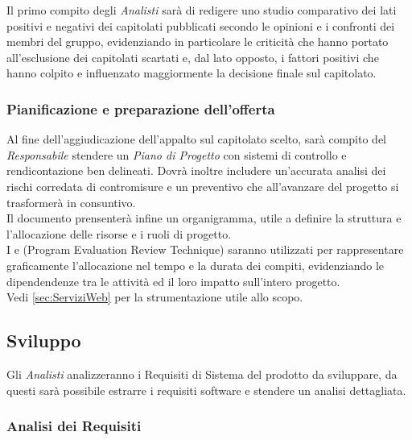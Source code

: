 \documentclass{scalatekids-article}
\begin{document}
Il primo compito degli \textit{Analisti} sarà di redigere uno studio comparativo
dei lati positivi e negativi dei capitolati pubblicati secondo le opinioni e i
confronti dei membri del gruppo, evidenziando in particolare le criticità che
hanno portato all'esclusione dei capitolati scartati e, dal lato opposto, i
fattori positivi che hanno colpito e influenzato maggiormente la decisione
finale sul capitolato.

\subsubsection{Pianificazione e preparazione dell'offerta}

Al fine dell'aggiudicazione dell'appalto sul capitolato scelto, sarà compito del
\textit{Responsabile} stendere un \textit{Piano di Progetto} con sistemi di
controllo e rendicontazione ben delineati. Dovrà inoltre includere un'accurata
analisi dei rischi corredata di contromisure e un preventivo che all'avanzare
del progetto si trasformerà in consuntivo.\\
Il documento prensenterà infine un organigramma, utile a definire la struttura
e l'allocazione delle risorse e i ruoli di progetto.\\
I  e  (Program Evaluation Review
Technique) saranno utilizzati per rappresentare graficamente l'allocazione nel
tempo e la durata dei compiti, evidenziando le dipendendenze tra le attività ed
il loro impatto sull'intero progetto.\\
Vedi \ref{sec:ServiziWeb} per la strumentazione utile allo scopo.

\subsection{Sviluppo}

Gli \textit{Analisti} analizzeranno i Requisiti di Sistema del prodotto da
sviluppare, da questi sarà possibile estrarre i requisiti software e stendere un
analisi dettagliata.

\subsubsection{Analisi dei Requisiti}
\end{document}

